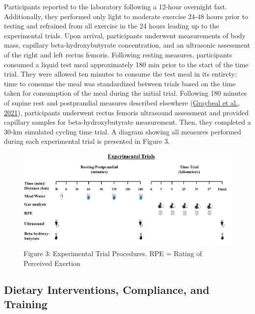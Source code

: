 \documentclass[]{cik}%
\begin{document}
Participants reported to the laboratory following a 12-hour overnight
fast. Additionally, they performed only light to moderate exercise 24-48
hours prior to testing and refrained from all exercise in the 24 hours
leading up to the experimental trials. Upon arrival, participants
underwent measurements of body mass, capillary beta-hydroxybutyrate
concentration, and an ultrasonic assessment of the right and left rectus
femoris. Following resting measures, participants consumed a liquid test
meal approximately 180 min prior to the start of the time trial. They
were allowed ten minutes to consume the test meal in its entirety; time
to consume the meal was standardized between trials based on the time
taken for consumption of the meal during the initial trial. Following
180 minutes of supine rest and postprandial measures described elsewhere
(\protect\hyperlink{ref-37}{Graybeal et al., 2021}), participants
underwent rectus femoris ultrasound assessment and provided capillary
samples for beta-hydroxybutyrate measurement. Then, they completed a
30-km simulated cycling time trial. A diagram showing all measures
performed during each experimental trial is presented in Figure 3.

\begin{figure}[H]
\includegraphics[width=1\linewidth]{figures/figure3} \caption{Figure 3: Experimental Trial Procedures. RPE = Rating of Perceived Exertion}\label{fig:fig3pdf}
\end{figure}

\hypertarget{dietary-interventions-compliance-and-training}{%
\subsection{Dietary Interventions, Compliance, and
Training}\label{dietary-interventions-compliance-and-training}}
\end{document}
